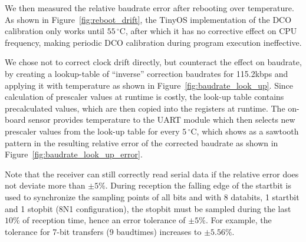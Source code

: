 We then measured the relative baudrate error after rebooting over temperature.
As shown in Figure~\ref{fig:reboot_drift}, the TinyOS implementation of the \ac{DCO} calibration only works until $55\,^{\circ}\mathrm{C}$, after which it has no corrective effect on CPU frequency, making periodic \ac{DCO} calibration during program execution ineffective.

We chose not to correct clock drift directly, but counteract the effect on baudrate, by creating a lookup-table of ``inverse'' correction baudrates for 115.2kbps and applying it with temperature as shown in Figure~\ref{fig:baudrate_look_up}.
Since calculation of prescaler values at runtime is costly, the look-up table contains precalculated values, which are then copied into the registers at runtime.
The on-board sensor provides temperature to the \ac{UART} module which then selects new prescaler values from the look-up table for every $5\,^{\circ}\mathrm{C}$, which shows as a sawtooth pattern in the resulting relative error of the corrected baudrate as shown in Figure~\ref{fig:baudrate_look_up_error}.

Note that the receiver can still correctly read serial data if the relative error does not deviate more than $\pm5\%$. During reception the falling edge of the startbit is used to synchronize the sampling points of all bits and with 8 databits, 1 startbit and 1 stopbit (8N1 configuration), the stopbit must be sampled during the last $10\%$ of reception time, hence an error tolerance of $\pm5\%$.
For example, the tolerance for 7-bit transfers (9 baudtimes) increases to $\pm5.56\%$.

